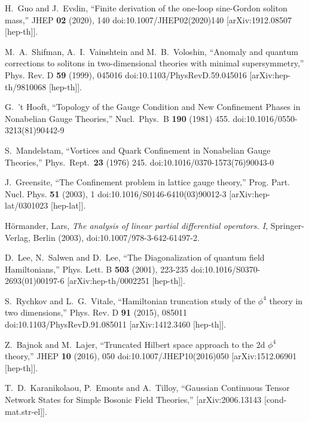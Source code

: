 \def\letter{0}\def\pr{0}\documentclass[a4paper,12pt, epsfig]{article}
\renewcommand{\(}{\begin{equation}}
\renewcommand{\)}{end{equation} \vspace{-.05in}\linebreak}
\renewcommand{\=}{\hspace{-.03in}=\hspace{-.02in}}
\renewcommand{\(}{\begin{equation}}
\renewcommand{\)}{\end{equation}}
\renewcommand{\(}{\begin{equation}}
\renewcommand{\)}{\end{equation}}
\begin{document}
\begin{thebibliography}{99}
H.~Guo and J.~Evslin,
``Finite derivation of the one-loop sine-Gordon soliton mass,''
JHEP \textbf{02} (2020), 140
doi:10.1007/JHEP02(2020)140
[arXiv:1912.08507 [hep-th]].

M.~A.~Shifman, A.~I.~Vainshtein and M.~B.~Voloshin,
``Anomaly and quantum corrections to solitons in two-dimensional theories with minimal supersymmetry,''
Phys. Rev. D \textbf{59} (1999), 045016
doi:10.1103/PhysRevD.59.045016
[arXiv:hep-th/9810068 [hep-th]].

  G.~'t Hooft,
  ``Topology of the Gauge Condition and New Confinement Phases in Nonabelian Gauge Theories,''
  Nucl.\ Phys.\ B {\bf 190} (1981) 455.
  doi:10.1016/0550-3213(81)90442-9

  S.~Mandelstam,
  ``Vortices and Quark Confinement in Nonabelian Gauge Theories,''
  Phys.\ Rept.\  {\bf 23} (1976) 245.
  doi:10.1016/0370-1573(76)90043-0

J.~Greensite,
``The Confinement problem in lattice gauge theory,''
Prog. Part. Nucl. Phys. \textbf{51} (2003), 1
doi:10.1016/S0146-6410(03)90012-3
[arXiv:hep-lat/0301023 [hep-lat]].


H\"{o}rmander, Lars,
\emph{The analysis of linear partial differential operators. {I}},
Springer-Verlag, Berlin (2003),
doi:10.1007/978-3-642-61497-2.


D.~Lee, N.~Salwen and D.~Lee,
``The Diagonalization of quantum field Hamiltonians,''
Phys. Lett. B \textbf{503} (2001), 223-235
doi:10.1016/S0370-2693(01)00197-6
[arXiv:hep-th/0002251 [hep-th]].

S.~Rychkov and L.~G.~Vitale,
``Hamiltonian truncation study of the $\phi^4$ theory in two dimensions,''
Phys. Rev. D \textbf{91} (2015), 085011
doi:10.1103/PhysRevD.91.085011
[arXiv:1412.3460 [hep-th]].

Z.~Bajnok and M.~Lajer,
``Truncated Hilbert space approach to the 2d $\phi^{4}$ theory,''
JHEP \textbf{10} (2016), 050
doi:10.1007/JHEP10(2016)050
[arXiv:1512.06901 [hep-th]].

T.~D.~Karanikolaou, P.~Emonts and A.~Tilloy,
``Gaussian Continuous Tensor Network States for Simple Bosonic Field Theories,''
[arXiv:2006.13143 [cond-mat.str-el]].

\end{thebibliography}
\end{document}
